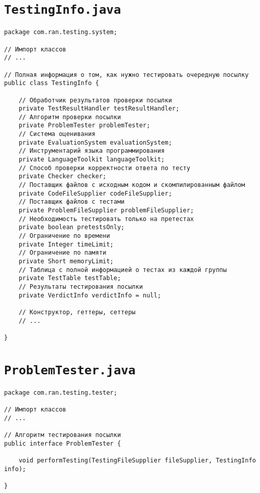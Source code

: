\section*{\texttt{TestingInfo.java}}
\begin{verbatim}
package com.ran.testing.system;

// Импорт классов
// ...

// Полная информация о том, как нужно тестировать очередную посылку
public class TestingInfo {

    // Обработчик результатов проверки посылки
    private TestResultHandler testResultHandler;
    // Алгоритм проверки посылки
    private ProblemTester problemTester;
    // Система оценивания
    private EvaluationSystem evaluationSystem;
    // Инструментарий языка программирования
    private LanguageToolkit languageToolkit;
    // Способ проверки корректности ответа по тесту
    private Checker checker;
    // Поставщик файлов с исходным кодом и скомпилированным файлом
    private CodeFileSupplier codeFileSupplier;
    // Поставщик файлов с тестами
    private ProblemFileSupplier problemFileSupplier;
    // Необходимость тестировать только на претестах
    private boolean pretestsOnly;
    // Ограничение по времени
    private Integer timeLimit;
    // Ограничение по памяти
    private Short memoryLimit;
    // Таблица с полной информацией о тестах из каждой группы
    private TestTable testTable;
    // Результаты тестирования посылки
    private VerdictInfo verdictInfo = null;

    // Конструктор, геттеры, сеттеры
    // ...

}
\end{verbatim}

\section*{\texttt{ProblemTester.java}}
\begin{verbatim}
package com.ran.testing.tester;

// Импорт классов
// ...

// Алгоритм тестирования посылки
public interface ProblemTester {

    void performTesting(TestingFileSupplier fileSupplier, TestingInfo info);

}
\end{verbatim}

